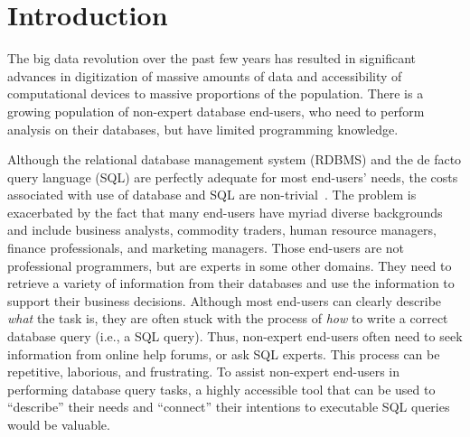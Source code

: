 \section{Introduction}
\label{sec:introduction}


The big data revolution over the past few years has resulted
in significant advances in digitization of massive amounts
of data and accessibility of computational devices to massive
proportions of the population. There is a growing population
of non-expert database end-users, who need to perform
analysis on their databases, but have limited programming knowledge.





Although the relational database management system (RDBMS) and the
de facto query language (SQL) are perfectly adequate for most end-users'
needs, 
the costs associated with use of database and SQL are non-trivial~\cite{Howe:2011}. 
The problem is exacerbated by the fact that many end-users
have myriad diverse backgrounds and include
business analysts, commodity traders, human resource managers,
finance professionals, and marketing managers. 
Those end-users are not professional programmers, but are experts in some
other domains. They need to retrieve a variety of information from their
databases and use the information to support their business decisions.
Although most end-users can clearly describe \textit{what} the task is, they
are often stuck with the process of \textit{how} to
write a correct database query (i.e., a SQL query).
Thus, non-expert end-users often need to
seek information from online help forums, or ask
SQL experts. This process can be repetitive, laborious, and frustrating.
To assist non-expert end-users in performing database query tasks,
a highly accessible tool that can be used to ``describe''
their needs and ``connect'' their intentions to executable
SQL queries would be valuable. %


